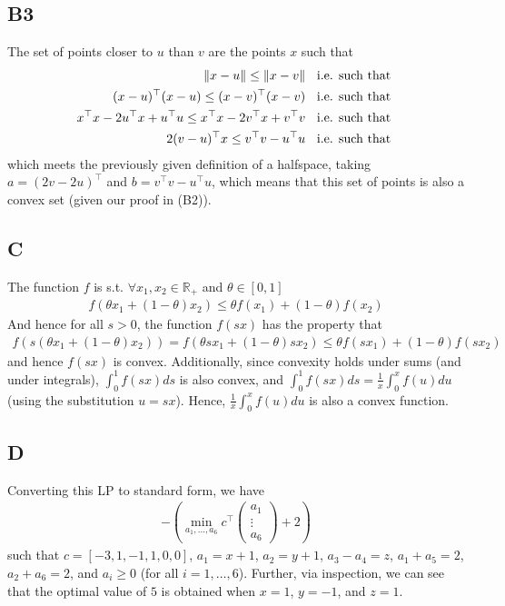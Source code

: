 \documentclass{article}
\begin{document}
\subsection{B3}
The set of points closer to $u$ than $v$ are the points $x$ such that
\begin{align}
    \|x-u\| \leq \|x-v\|  \hspace{2mm}\text{ i.e. such that }\\
    (x-u)^{\top}(x-u) \leq (x-v)^{\top}(x-v) \hspace{2mm}\text{ i.e. such that }\\
    x^{\top}x - 2 u^{\top} x + u^{\top}u \leq x^{\top}x - 2 v^{\top} x +
    v^{\top}v  \hspace{2mm}\text{ i.e. such that }\\
    2(v-u)^{\top} x \leq v^{\top}v - u^{\top}u \hspace{2mm}\text{ i.e. such
    that }\\
\end{align}
which meets the previously given definition of a halfspace, taking $a = (2v - 2u)^{\top}$ and 
$b = v^{\top}v - u^{\top}u$, which means that this set of points is also a convex set (given
our proof in (B2)).

\subsection{C}
The function $f$ is s.t. $\forall x_1,x_2 \in \mathbb{R}_+$ and $\theta \in [0,1]$
\begin{align}
    f(\theta x_1 + (1-\theta)x_2) \leq \theta f(x_1) + (1-\theta) f(x_2)
\end{align}
And hence for all $s>0$, the function $f(sx)$ has the property that
\begin{align}
    f(s (\theta  x_1 + (1-\theta) x_2)) = f( \theta s  x_1 + (1-\theta) s  x_2)
    \leq \theta f(s x_1) + (1-\theta) f(s x_2)
\end{align}
and hence $f(sx)$ is convex. Additionally, since convexity holds under sums
(and under integrals), $\int_0^1 f(sx) ds$ is also convex, and $\int_0^1 f(sx)
ds = \frac{1}{x} \int_0^x f(u) du$ (using the substitution $u=sx$). Hence,
$\frac{1}{x} \int_0^x f(u) du$ is also a convex function.


\subsection{D}
Converting this LP to standard form, we have
\begin{align}
    -\left( \min_{a_1,\ldots,a_6} c^{\top} \begin{pmatrix}a_1\\ \vdots\\ a_6\end{pmatrix}  + 2  \right)
\end{align}
such that $c = [-3,1,-1,1,0,0]$, $a_1= x+1$, $a_2 = y+1$, $a_3-a_4=z$, $a_1 + a_5 = 2$, $a_2 + a_6 = 2$,
and $a_i \geq 0$ (for all $i=1,\ldots,6$). Further, via inspection, we can see
that the optimal value of $5$ is obtained when $x=1$, $y=-1$, and $z=1$.
\end{document}
